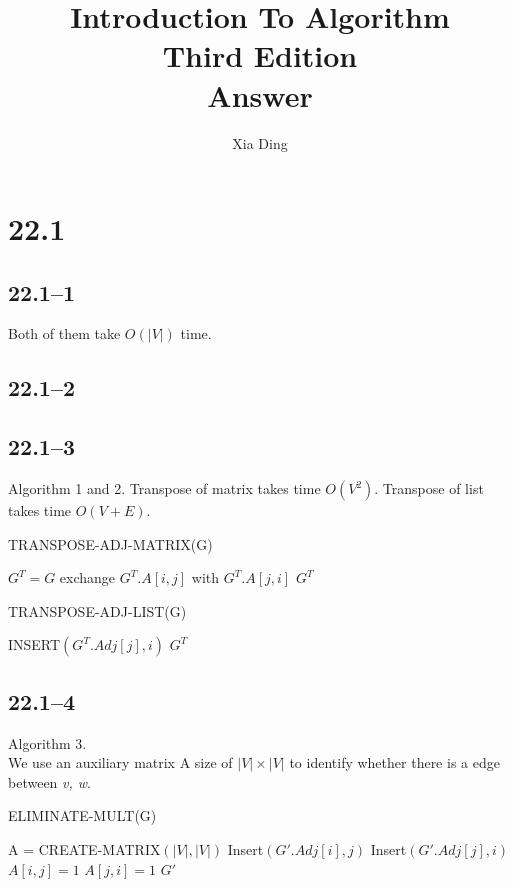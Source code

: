 \documentclass{article}
\author{Xia Ding}
\title{\textbf{Introduction To Algorithm}\\Third Edition\\\textbf{Answer}}
\begin{document}
\maketitle
\section*{22.1}
\subsection*{22.1--1}
Both of them take $O(|V|)$ time.

\subsection*{22.1--2}

\subsection*{22.1--3}
Algorithm 1 and 2. Transpose of matrix takes time $O(V^2)$. Transpose of list
takes time $O(V+E)$.
\begin{algorithm}
  \caption{TRANSPOSE-ADJ-MATRIX(G)}
  \begin{algorithmic}[1]
    \STATE $G^T = G$
    \STATE exchange $G^T.A[i, j]$ with $G^T.A[j, i]$
    \ENDFOR
    \ENDFOR
    \RETURN $G^T$
  \end{algorithmic}
\end{algorithm}

\begin{algorithm}
  \caption{TRANSPOSE-ADJ-LIST(G)}
  \begin{algorithmic}[1]
    \STATE INSERT$(G^T.Adj[j], i)$
    \ENDFOR
    \ENDFOR
    \RETURN $G^T$
  \end{algorithmic}
\end{algorithm}

\subsection*{22.1--4}
Algorithm 3.\\
We use an auxiliary matrix A size of $|V|\times|V|$ to identify whether there is a edge between \textit{v, w}.
\begin{algorithm}
  \caption{ELIMINATE-MULT(G)}
  \begin{algorithmic}[1]
    \STATE A = CREATE-MATRIX$(|V|, |V|)$
    \STATE Insert$(G'.Adj[i], j)$
    \STATE Insert$(G'.Adj[j], i)$
    \ENDIF
    \STATE $A[i, j] = 1$
    \STATE $A[j, i] = 1$
    \ENDFOR
    \ENDFOR
    \RETURN $G'$
  \end{algorithmic}
\end{algorithm}
\end{document}
